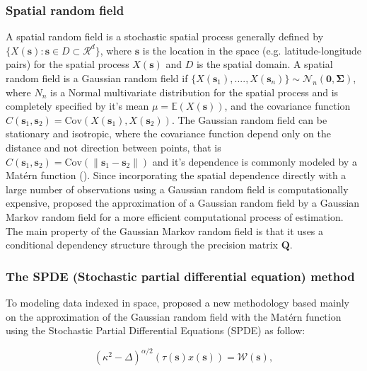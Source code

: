 \documentclass{article}
\begin{document}
\subsubsection{Spatial random field}
A spatial random field is a stochastic spatial process generally defined by $\{X(\boldsymbol{s}): \boldsymbol{s} \in D \subset \mathcal{R}^{d}\}$, where $\boldsymbol{s}$ is the location in the space (e.g. latitude-longitude pairs) for the spatial process $X(\boldsymbol{s})$ and $D$ is the spatial domain. A spatial random field is a Gaussian random field if $\{X(\boldsymbol{s}_{1}),...., X(\boldsymbol{s}_{n})\} \sim \mathcal{N}_{n}(\boldsymbol{0}, \boldsymbol{\Sigma})$, where $N_{n}$ is a Normal multivariate distribution for the spatial process and is completely specified by it's mean $\mu = \mathbb{E}(X(\boldsymbol{s}))$, and the covariance function $C(\boldsymbol{s}_{1}, \boldsymbol{s}_{2}) = \text{Cov}(X(\boldsymbol{s}_{1}), X(\boldsymbol{s}_{2}))$. The Gaussian random field can be stationary and isotropic, where the covariance function depend only on the distance and not direction between points, that is $C(\boldsymbol{s}_{1}, \boldsymbol{s}_{2}) = \text{Cov}(\|\boldsymbol{s}_{1} - \boldsymbol{s}_{2}\|)$ and it's dependence is commonly modeled by a Matérn function (\cite{stein2012interpolation}\cite{yuan2011models}). Since incorporating the spatial dependence directly with a large number of observations using a Gaussian random field is computationally expensive, \cite{rue2005gaussian} proposed the approximation of a Gaussian random field by a Gaussian Markov random field for a more efficient computational process of estimation. The main property of the Gaussian Markov random field is that it uses a conditional dependency structure through the precision matrix $\boldsymbol{Q}$.


\subsubsection{The SPDE (Stochastic partial differential equation) method}

To modeling data indexed in space, \cite{lindgren2011explicit} proposed a new methodology based mainly on the approximation of the Gaussian random field with the Matérn function using the Stochastic Partial Differential Equations (SPDE) as follow:

\begin{equation}\label{eqn:eq1}
(\kappa^{2} - \Delta)^{\alpha/2}(\tau(\boldsymbol{s}) x(\boldsymbol{s})) = \boldsymbol{\mathcal{W}(s)},
\end{equation}
 
\end{document}
